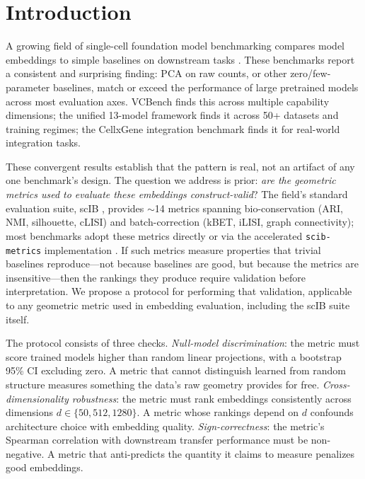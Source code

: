 \documentclass[9pt,lineno]{elife}
\begin{document}
\section{Introduction}

A growing field of single-cell foundation model benchmarking compares model embeddings to simple baselines on downstream tasks \citep{luecken2022scib, wu2025scfm, vcbench2026, unifiedscfm2026, cellxgeneintegration2026}. These benchmarks report a consistent and surprising finding: PCA on raw counts, or other zero/few-parameter baselines, match or exceed the performance of large pretrained models across most evaluation axes. VCBench \citep{vcbench2026} finds this across multiple capability dimensions; the unified 13-model framework \citep{unifiedscfm2026} finds it across 50+ datasets and training regimes; the CellxGene integration benchmark \citep{cellxgeneintegration2026} finds it for real-world integration tasks.

These convergent results establish that the pattern is real, not an artifact of any one benchmark's design. The question we address is prior: \emph{are the geometric metrics used to evaluate these embeddings construct-valid}? The field's standard evaluation suite, scIB \citep{luecken2022scib}, provides $\sim$14 metrics spanning bio-conservation (ARI, NMI, silhouette, cLISI) and batch-correction (kBET, iLISI, graph connectivity); most benchmarks adopt these metrics directly or via the accelerated \texttt{scib-metrics} implementation \citep{scibmetrics2023}. If such metrics measure properties that trivial baselines reproduce---not because baselines are good, but because the metrics are insensitive---then the rankings they produce require validation before interpretation. We propose a protocol for performing that validation, applicable to any geometric metric used in embedding evaluation, including the scIB suite itself.

The protocol consists of three checks. \emph{Null-model discrimination}: the metric must score trained models higher than random linear projections, with a bootstrap 95\% CI excluding zero. A metric that cannot distinguish learned from random structure measures something the data's raw geometry provides for free. \emph{Cross-dimensionality robustness}: the metric must rank embeddings consistently across dimensions $d \in \{50, 512, 1280\}$. A metric whose rankings depend on $d$ confounds architecture choice with embedding quality. \emph{Sign-correctness}: the metric's Spearman correlation with downstream transfer performance must be non-negative. A metric that anti-predicts the quantity it claims to measure penalizes good embeddings.
\end{document}
